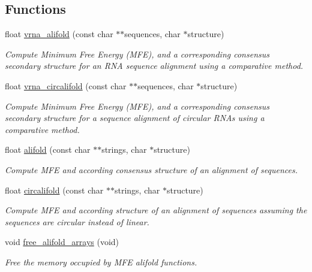 \subsection*{Functions}
\begin{DoxyCompactItemize}
\item 
float \hyperlink{group__consensus__mfe__fold_ga6c9d3bef3e92c6d423ffac9f981418c1}{vrna\+\_\+alifold} (const char $\ast$$\ast$sequences, char $\ast$structure)
\begin{DoxyCompactList}\small\item\em Compute Minimum Free Energy (M\+FE), and a corresponding consensus secondary structure for an R\+NA sequence alignment using a comparative method. \end{DoxyCompactList}\item 
float \hyperlink{group__consensus__mfe__fold_ga17a1be7490468c29c335ba9bffacba53}{vrna\+\_\+circalifold} (const char $\ast$$\ast$sequences, char $\ast$structure)
\begin{DoxyCompactList}\small\item\em Compute Minimum Free Energy (M\+FE), and a corresponding consensus secondary structure for a sequence alignment of circular R\+N\+As using a comparative method. \end{DoxyCompactList}\item 
float \hyperlink{group__consensus__mfe__fold_ga4cf00f0659e5f0480335d69e797f05b1}{alifold} (const char $\ast$$\ast$strings, char $\ast$structure)
\begin{DoxyCompactList}\small\item\em Compute M\+FE and according consensus structure of an alignment of sequences. \end{DoxyCompactList}\item 
float \hyperlink{group__consensus__mfe__fold_gadbd3b0b1c144cbfb4efe704b2b260f96}{circalifold} (const char $\ast$$\ast$strings, char $\ast$structure)
\begin{DoxyCompactList}\small\item\em Compute M\+FE and according structure of an alignment of sequences assuming the sequences are circular instead of linear. \end{DoxyCompactList}\item 
void \hyperlink{group__consensus__mfe__fold_ga72095e4554b5d577250ea14c42acc49e}{free\+\_\+alifold\+\_\+arrays} (void)
\begin{DoxyCompactList}\small\item\em Free the memory occupied by M\+FE alifold functions. \end{DoxyCompactList}\end{DoxyCompactItemize}


